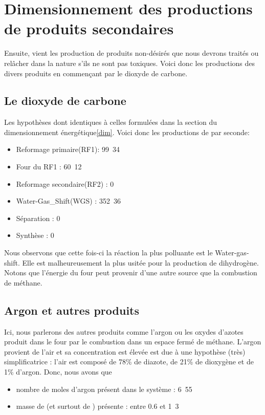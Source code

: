 \section{Dimensionnement des productions de produits secondaires}

Ensuite, vient les production de produits non-désirés que nous devrons traités ou relâcher dans la nature s'ils ne sont pas toxiques. Voici donc les productions des divers produits en commençant par le dioxyde de carbone.

\subsection{Le dioxyde de carbone}

Les hypothèses dont identiques à celles formulées dans la section du dimensionnement énergétique\ref{dim}. Voici donc les productions de  par seconde:

\begin{itemize}
	\item Reformage primaire(RF1): \unit{99.34}{\mole}\\
	\item Four du RF1 : \unit{60.12}{\mole}\\
	\item Reformage secondaire(RF2) : \unit{0}{\mole}\\
	\item Water-Gas_Shift(WGS) : \unit{352.36}{\mole}\\
	\item Séparation : \unit{0}{\mole}\\
	\item Synthèse : \unit{0}{\mole}\\
\end{itemize}

Nous observons que cette fois-ci la réaction la plus polluante est le Water-gas-shift. Elle est malheureusement la plus usitée pour la production de dihydrogène. Notons que l'énergie du four peut provenir d'une autre source que la combustion de méthane.

\subsection{Argon et autres produits}

Ici, nous parlerons des autres produits comme l'argon ou les oxydes d'azotes produit dans le four par le combustion dans un espace fermé de méthane. L'argon provient de l'air et sa concentration est élevée est due à une hypothèse (très) simplificatrice : l'air est composé de 78\% de diazote, de 21\% de dioxygène et de 1\% d'argon. Donc, nous avons que
\begin{itemize}
	\item nombre de moles d'argon présent dans le système : \unit{6.55}{\mole\per\second}
	\item masse de  (et surtout de ) présente : entre 0.6 et \unit{1.3}{\ton\per\second} \cite{nitrogen_issue}
\end{itemize}

